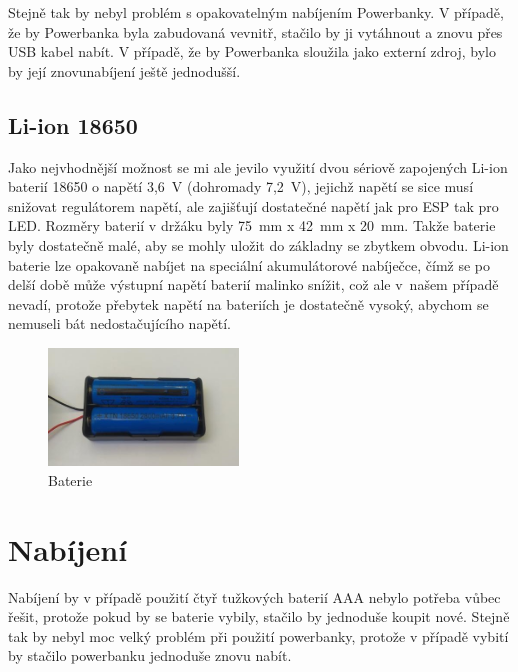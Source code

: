 Stejně tak by nebyl problém s opakovatelným nabíjením Powerbanky.  V případě, že by Powerbanka byla zabudovaná vevnitř, stačilo by ji vytáhnout a znovu přes USB kabel nabít. 
V případě, že by Powerbanka sloužila jako externí zdroj, bylo by její znovunabíjení ještě jednodušší.


\subsection{Li-ion 18650}

Jako nejvhodnější možnost se mi ale jevilo využití dvou sériově zapojených Li-ion baterií 18650 \cite{liion} o napětí 3,6~V (dohromady 7,2~V), jejichž napětí se sice musí snižovat regulátorem napětí, ale zajišťují dostatečné napětí jak pro ESP tak pro LED. Rozměry baterií v držáku byly 75~mm x 42~mm x 20~mm.  Takže baterie byly dostatečně malé, aby se mohly uložit do základny se zbytkem obvodu. Li-ion baterie lze opakovaně nabíjet na speciální akumulátorové nabíječce, čímž se po delší době může výstupní napětí baterií malinko snížit, což ale v~našem případě nevadí, protože přebytek napětí na bateriích je dostatečně vysoký, abychom se nemuseli bát nedostačujícího napětí. 


\begin{figure}[htbp]
	\centering
	\includegraphics[width=0.45\textwidth]{img/02ele/Battery_Pack.jpg}
	\caption{Baterie}
\end{figure}





\section{Nabíjení}
Nabíjení by v případě použití čtyř tužkových baterií AAA nebylo potřeba vůbec řešit, protože pokud by se baterie vybily, stačilo by jednoduše koupit nové. Stejně tak by nebyl moc velký problém při použití powerbanky, protože v případě vybití by stačilo powerbanku jednoduše znovu nabít.

